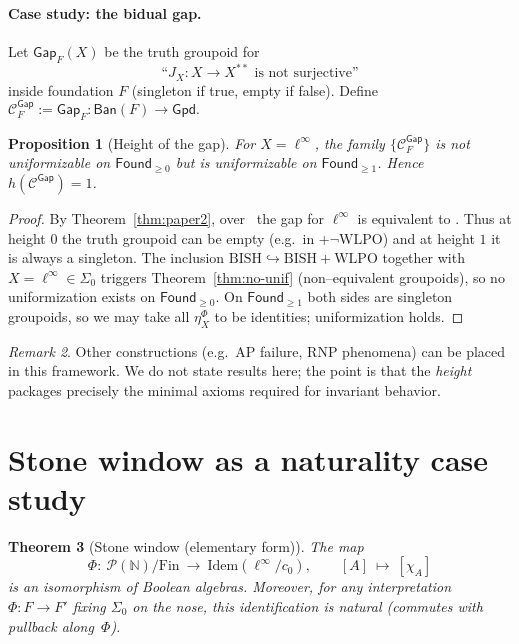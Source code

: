 \documentclass[11pt]{article}
\newtheorem{theorem}{Theorem}[section]
\newtheorem{proposition}[theorem]{Proposition}
\theoremstyle{definition}
\theoremstyle{remark}
\newtheorem{remark}[theorem]{Remark}
\newcommand{\N}{\mathbb{N}}
\newcommand{\cnull}{c_0}
\newcommand{\linf}{\ell^\infty}
\newcommand{\WLPO}{\mathrm{WLPO}}
\newcommand{\BISH}{\mathrm{BISH}}
\newcommand{\Found}{\mathsf{Found}}
\newcommand{\Ban}{\mathsf{Ban}}
\newcommand{\Gpd}{\mathsf{Gpd}}
\newcommand{\SigmaZero}{\Sigma_{0}}
\begin{document}
\paragraph{Case study: the bidual gap.}
Let \(\mathsf{Gap}_F(X)\) be the truth groupoid for
\[
  \text{``$J_X:X\to X^{**}$ is not surjective''}
\]
inside foundation \(F\) (singleton if true, empty if false). Define
\(
 \mathcal C^{\mathsf{Gap}}_F:=\mathsf{Gap}_F:\Ban(F)\to\Gpd.
\)

\begin{proposition}[Height of the gap]\label{prop:gap-height}
For \(X=\linf\), the family \(\{\mathcal C^{\mathsf{Gap}}_F\}\) is not uniformizable on \(\Found_{\ge 0}\) but is uniformizable on \(\Found_{\ge 1}\). Hence \(h(\mathcal C^{\mathsf{Gap}})=1\).
\end{proposition}

\begin{proof}
By Theorem~\ref{thm:paper2}, over \BISH\ the gap for \(\linf\) is equivalent to \WLPO. Thus at height \(0\) the truth groupoid can be empty (e.g.\ in \BISH+\(\neg\WLPO\)) and at height \(1\) it is always a singleton. The inclusion \(\BISH\hookrightarrow\BISH+\WLPO\) together with \(X=\linf\in\SigmaZero\) triggers Theorem~\ref{thm:no-unif} (non--equivalent groupoids), so no uniformization exists on \(\Found_{\ge 0}\). On \(\Found_{\ge 1}\) both sides are singleton groupoids, so we may take all \(\eta^\Phi_X\) to be identities; uniformization holds.
\end{proof}

\begin{remark}
Other constructions (e.g.\ AP failure, RNP phenomena) can be placed in this framework. We do not state results here; the point is that the \emph{height} packages precisely the minimal axioms required for invariant behavior.
\end{remark}

\section{Stone window as a naturality case study}\label{sec:stone}

\begin{theorem}[Stone window (elementary form)]\label{thm:stone}
The map
\[
  \Phi:\ \mathcal{P}(\N)/\mathrm{Fin} \ \longrightarrow\ \mathrm{Idem}(\linf/\cnull),\qquad
  [A]\ \longmapsto\ [\chi_A]
\]
is an isomorphism of Boolean algebras. Moreover, for any interpretation \(\Phi:F\to F'\) fixing \(\SigmaZero\) on the nose, this identification is natural (commutes with pullback along~\(\Phi\)).
\end{theorem}
\end{document}
